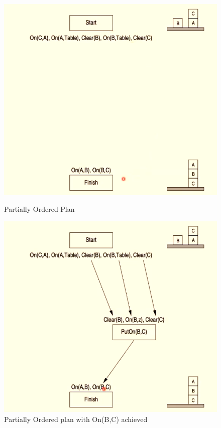 \documentclass[a4paper]{article}
\theoremstyle{plain}
\theoremstyle{definition}
\theoremstyle{remark}
\begin{document}
\begin{figure}[H]
   \begin{minipage}{0.48\textwidth}
     \centering
     \includegraphics[width=.9\linewidth]{f1.png}
     \caption{Partially Ordered Plan}\label{Fig:4Data1}
   \end{minipage}\hfill
   \begin{minipage}{0.48\textwidth}
     \centering
     \includegraphics[width=.9\linewidth]{f2.png}
     \caption{Partially Ordered plan with On(B,C) achieved}\label{Fig:Data2}
   \end{minipage}
\end{figure}
\end{document}
